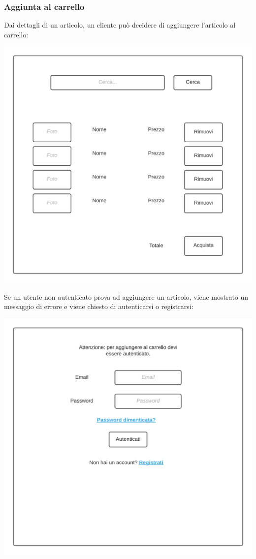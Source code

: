 \documentclass[12pt]{article}
\begin{document}
\subsubsection{Aggiunta al carrello}
\label{mockup:clientecarrello}
Dai dettagli di un articolo, un cliente può decidere di aggiungere l'articolo al carrello:

\begin{center}
\includegraphics[height=0.3\textheight]{Mockup/Cliente/Carrello}
\end{center}

\newpage

Se un utente non autenticato prova ad aggiungere un articolo, viene mostrato un messaggio di errore e viene chiesto di autenticarsi o registrarsi:
\begin{center}
\includegraphics[height=0.3\textheight]{Mockup/Cliente/CarrelloRichiestaLogin}
\end{center}
\end{document}
